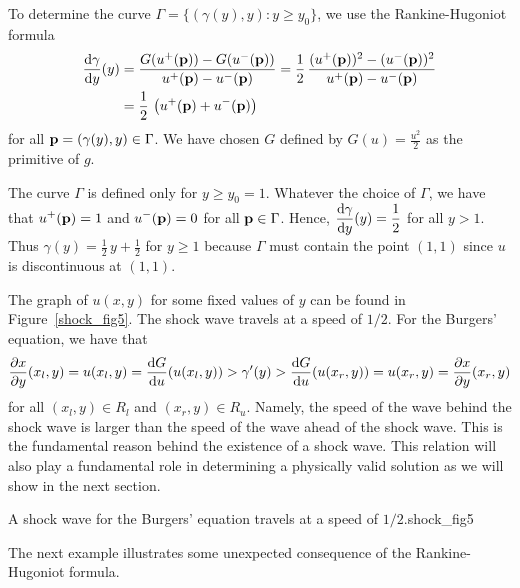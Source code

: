 \begin{egg}
To determine the curve $\Gamma = \{ (\gamma(y),y) : y \geq y_0 \}$, we use the
Rankine-Hugoniot formula
\begin{equation} \label{BERankHugForm}
\begin{split}
\frac{\mathrm{d}\gamma}{\mathrm{d}{y}}(y) &= \frac{G(u^+(\mathbf{p}))-G(u^-(\mathbf{p}))}
{u^+(\mathbf{p}) - u^-(\mathbf{p})} =
\frac{1}{2} \, \frac{(u^+(\mathbf{p}))^2 - (u^-(\mathbf{p}))^2}
{u^+(\mathbf{p}) - u^-(\mathbf{p})} \\
&= \frac{1}{2} \, \left(u^+(\mathbf{p}) + u^-(\mathbf{p})\right)
\end{split}
\end{equation}
for all $\mathbf{p}=(\gamma(y),y) \in \Gamma$.  We have chosen $G$
defined by $\displaystyle G(u) = \frac{u^2}{2}$ as the primitive of $g$.

The curve $\Gamma$ is defined only for $y\geq y_0 = 1$.  Whatever the choice
of $\Gamma$, we have that $\displaystyle u^+(\mathbf{p}) = 1$ and
$\displaystyle u^-(\mathbf{p}) = 0$ for all
$\mathbf{p} \in \Gamma$.  Hence,
$\displaystyle \frac{\mathrm{d}\gamma}{\mathrm{d}{y}}(y) = \frac{1}{2}$ for all $y>1$.
Thus $\displaystyle \gamma(y) = \frac{1}{2}\, y + \frac{1}{2}$
for $y \geq 1$ because $\Gamma$ must contain the point $(1,1)$ since
$u$ is discontinuous at $(1,1)$.

The graph of $u(x,y)$ for some fixed values of $y$ can be found in
Figure~\ref{shock_fig5}.  The shock wave travels at a speed of $1/2$.
For the Burgers' equation, we have that
\[
\frac{\partial{x}}{\partial y}(x_l,y) = u(x_l,y) = \frac{\mathrm{d}G}{\mathrm{d}{u}}(u(x_l,y))
> \gamma'(y) > \frac{\mathrm{d}G}{\mathrm{d}{u}}(u(x_r,y)) = u(x_r,y) = \frac{\partial{x}}{\partial y}(x_r,y) 
\]
for all $(x_l,y) \in R_l$ and $(x_r,y) \in R_u$.  Namely, the speed of
the wave behind the shock wave is larger than the speed of the wave
ahead of the shock wave.  This is the fundamental reason behind the
existence of a shock wave.  This relation will also play a fundamental
role in determining a physically valid solution as we will show in the
next section.
\end{egg}

{A shock wave for the Burgers' equation travels at a speed of
$1/2$.}{shock_fig5}

The next example illustrates some unexpected consequence of the
Rankine-Hugoniot formula.

